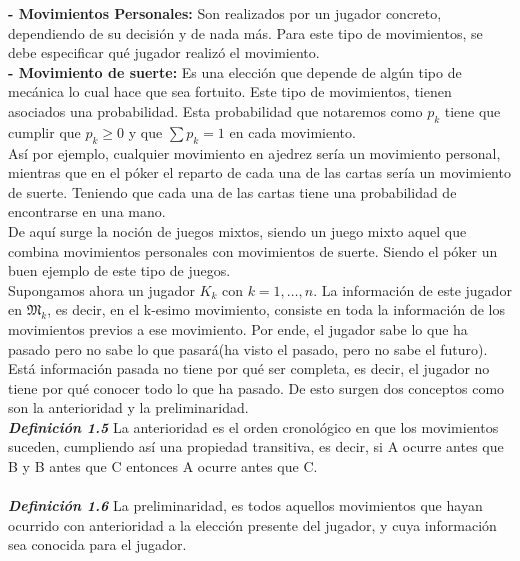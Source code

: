 \documentclass[10pt,a4paper]{book}
\begin{document}
\textbf{- Movimientos Personales:} Son realizados por un jugador concreto, dependiendo de su decisión y de nada más. Para este tipo de movimientos, se debe especificar qué jugador realizó el movimiento.\\

\textbf{- Movimiento de suerte:} Es una elección que depende de algún tipo de mecánica lo cual hace que sea fortuito. Este tipo de movimientos, tienen asociados una probabilidad. Esta probabilidad que notaremos como $p_k$ tiene que cumplir que $p_k \geq 0$ y que $\sum p_k=1$ en cada movimiento.\\

Así por ejemplo, cualquier movimiento en ajedrez sería un movimiento personal, mientras que en el póker el reparto de cada una de las cartas sería un movimiento de suerte. Teniendo que cada una de las cartas tiene una probabilidad de encontrarse en una mano. \\

De aquí surge la noción de juegos mixtos, siendo un juego mixto aquel que combina movimientos personales con movimientos de suerte. Siendo el póker un buen ejemplo de este tipo de juegos.\\


Supongamos ahora un jugador $K_k$ con $k=1, \ldots, n$. La información de este jugador en $\mathfrak{M}_k$, es decir, en el k-esimo movimiento, consiste en toda la información de los movimientos previos a ese movimiento. Por ende, el jugador sabe lo que ha pasado pero no sabe lo que pasará(ha visto el pasado, pero no sabe el futuro).\\ 

Está información pasada no tiene por qué ser completa, es decir, el jugador no tiene por qué conocer todo lo que ha pasado. De esto surgen dos conceptos como son la anterioridad y la preliminaridad.\\
 
\textit{\textbf{Definición 1.5}} La anterioridad es el orden cronológico en que los movimientos suceden, cumpliendo así una propiedad transitiva, es decir, si A ocurre antes que B y B antes que C entonces A ocurre antes que C.\\\\

\textit{\textbf{Definición 1.6}} La preliminaridad, es todos aquellos movimientos que hayan ocurrido con anterioridad a la elección presente del jugador, y cuya información sea conocida para el jugador.\\\\
\end{document}
